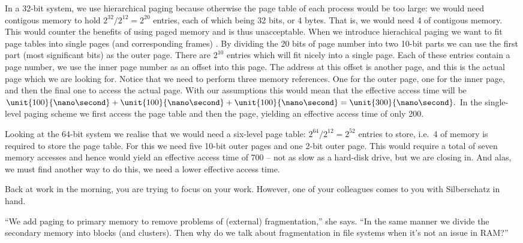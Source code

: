 \documentclass[addpoints,svv]{miunexam}
\begin{document}
\begin{questions}
\begin{solution}
    In a 32-bit system, we use hierarchical paging because otherwise the page 
    table of each process would be too large:
    we would need contigous memory to hold \(2^{32} / 2^{12} = 2^{20}\) 
    entries, each of which being 32 bits, or 4 bytes.
    That is, we would need \unit{4}{\mebi\byte} of contigous memory.
    This would counter the benefits of using paged memory and is thus 
    unacceptable.
    When we introduce hierachical paging we want to fit page tables into single 
    pages (and corresponding frames) \cite[p. 337]{Silberschatz2009osc}.
    By dividing the 20 bits of page number into two 10-bit parts we can use the 
    first part (most significant bits) as the outer page.
    There are \(2^{10}\) entries which will fit nicely into a single page.
    Each of these entries contain a page number, we use the inner page number 
    as an offset into this page.
    The address at this offset is another page, and this is the actual page 
    which we are looking for.
    Notice that we need to perform three memory references.
    One for the outer page, one for the inner page, and then the final one to 
    access the actual page.
    With our assumptions this would mean that the effective access time will be 
    \(\unit{100}{\nano\second} + \unit{100}{\nano\second} 
    + \unit{100}{\nano\second} = \unit{300}{\nano\second}.\)
    In the single-level paging scheme we first access the page table and then 
    the page, yielding an effective access time of only 
    \unit{200}{\nano\second}.

    Looking at the 64-bit system we realise that we would need a six-level page 
    table: \(2^{64} / 2^{12} = 2^{52}\) entries to store, i.e.\ 
    \unit{4}{\tebi\byte} of memory is required to store the page table.
    For this we need five 10-bit outer pages and one 2-bit outer page.
    This would require a total of seven memory accesses and hence would yield 
    an effective access time of \unit{700}{\nano\second} -- not as slow as 
    a hard-disk drive, but we are closing in.
    And alas, we must find another way to do this, we need a lower effective 
    access time.
  \end{solution}


  \question
  Back at work in the morning, you are trying to focus on your work.
  However, one of your colleagues comes to you with Silberschatz in hand.

  ``We add paging to primary memory to remove problems of (external) 
  fragmentation,'' she says.
  ``In the same manner we divide the secondary memory into blocks (and 
  clusters).
  Then why do we talk about fragmentation in file systems when it's not an 
  issue in RAM?''


\end{questions}
\end{document}
